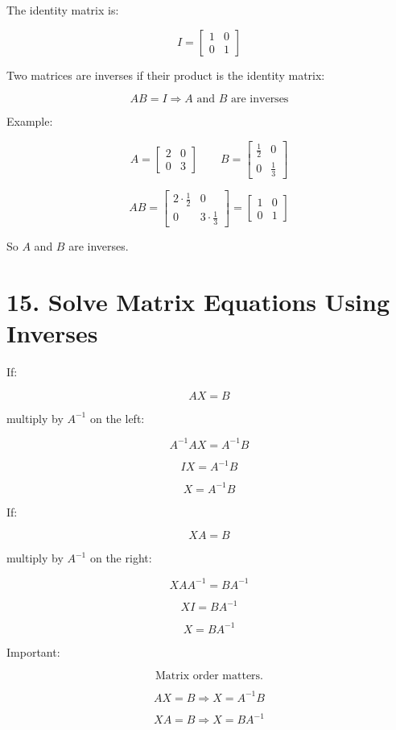 \documentclass[11pt]{article}
\begin{document}
The identity matrix is:

\[
I=
\begin{bmatrix}
1 & 0\\
0 & 1
\end{bmatrix}
\]

Two matrices are inverses if their product is the identity matrix:

\[
AB=I \Rightarrow A \text{ and } B \text{ are inverses}
\]

Example:

\[
A=
\begin{bmatrix}
2 & 0\\
0 & 3
\end{bmatrix}
\qquad
B=
\begin{bmatrix}
\frac{1}{2} & 0\\
0 & \frac{1}{3}
\end{bmatrix}
\]

\[
AB=
\begin{bmatrix}
2\cdot\frac{1}{2} & 0\\
0 & 3\cdot\frac{1}{3}
\end{bmatrix}
=
\begin{bmatrix}
1 & 0\\
0 & 1
\end{bmatrix}
\]

So \(A\) and \(B\) are inverses.

\section*{15. Solve Matrix Equations Using Inverses}

If:

\[
AX=B
\]

multiply by \(A^{-1}\) on the left:

\[
A^{-1}AX=A^{-1}B
\]

\[
IX=A^{-1}B
\]

\[
X=A^{-1}B
\]

If:

\[
XA=B
\]

multiply by \(A^{-1}\) on the right:

\[
XAA^{-1}=BA^{-1}
\]

\[
XI=BA^{-1}
\]

\[
X=BA^{-1}
\]

Important:

\[
\text{Matrix order matters.}
\]

\[
AX=B \Rightarrow X=A^{-1}B
\]

\[
XA=B \Rightarrow X=BA^{-1}
\]
\end{document}
